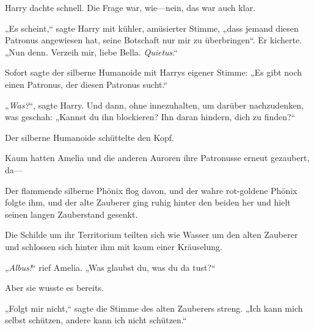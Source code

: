 Harry dachte schnell. Die Frage war, wie—nein, das war auch klar.

„Es scheint,“ sagte Harry mit kühler, amüsierter Stimme, „dass jemand diesen Patronus angewiesen hat, seine Botschaft nur mir zu überbringen“. Er kicherte. „Nun denn. Verzeih mir, liebe Bella. \emph{Quietus}.“

Sofort sagte der silberne Humanoide mit Harrys eigener Stimme: „Es gibt noch einen Patronus, der diesen Patronus sucht.“

„\emph{Was?}“, sagte Harry. Und dann, ohne innezuhalten, um darüber nachzudenken, was geschah: „Kannst du ihn blockieren? Ihn daran hindern, dich zu finden?“

Der silberne Humanoide schüttelte den Kopf.

\later

Kaum hatten Amelia und die anderen Auroren ihre Patronusse erneut gezaubert, da—

Der flammende silberne Phönix flog davon, und der wahre rot-goldene Phönix folgte ihm, und der alte Zauberer ging ruhig hinter den beiden her und hielt seinen langen Zauberstand gesenkt.

Die Schilde um ihr Territorium teilten sich wie Wasser um den alten Zauberer und schlossen sich hinter ihm mit kaum einer Kräuselung.

„\emph{Albus!}“ rief Amelia. „Was glaubst du, was du da tust?“

Aber sie wusste es bereits.

„Folgt mir nicht,“ sagte die Stimme des alten Zauberers streng. „Ich kann mich selbst schützen, andere kann ich nicht schützen.“

